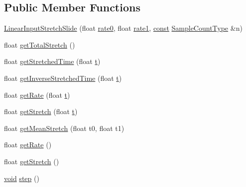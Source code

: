 \subsection*{Public Member Functions}
\begin{DoxyCompactItemize}
\item 
\hyperlink{class__sbsms___1_1_linear_input_stretch_slide_aae865a990bceaccef3c1158edd4400ac}{Linear\+Input\+Stretch\+Slide} (float \hyperlink{class__sbsms___1_1_linear_input_stretch_slide_ae0200a4c98938e77f57ef34a1d03c34f}{rate0}, float \hyperlink{class__sbsms___1_1_linear_input_stretch_slide_ac1cf5c07b027eaa2e5b93d0c45e9821c}{rate1}, \hyperlink{getopt1_8c_a2c212835823e3c54a8ab6d95c652660e}{const} \hyperlink{namespace__sbsms___ae4ba47977e7e07f5945e529e2256b662}{Sample\+Count\+Type} \&n)
\item 
float \hyperlink{class__sbsms___1_1_linear_input_stretch_slide_a250cdb5eec1f46eb843f8b78518d2253}{get\+Total\+Stretch} ()
\item 
float \hyperlink{class__sbsms___1_1_linear_input_stretch_slide_a4c1af2b7abb0101000e205cae3af7e71}{get\+Stretched\+Time} (float \hyperlink{octave__test_8m_aaccc9105df5383111407fd5b41255e23}{t})
\item 
float \hyperlink{class__sbsms___1_1_linear_input_stretch_slide_a031d44648e983b0f6ce5f4f07d03ee40}{get\+Inverse\+Stretched\+Time} (float \hyperlink{octave__test_8m_aaccc9105df5383111407fd5b41255e23}{t})
\item 
float \hyperlink{class__sbsms___1_1_linear_input_stretch_slide_a3df3374b2fc91afa202c2fa421749ad9}{get\+Rate} (float \hyperlink{octave__test_8m_aaccc9105df5383111407fd5b41255e23}{t})
\item 
float \hyperlink{class__sbsms___1_1_linear_input_stretch_slide_a56dd3bd5fbfb04f5d2eed9a644f11175}{get\+Stretch} (float \hyperlink{octave__test_8m_aaccc9105df5383111407fd5b41255e23}{t})
\item 
float \hyperlink{class__sbsms___1_1_linear_input_stretch_slide_a75f5ae653fed20fd1b2dd014a9603ede}{get\+Mean\+Stretch} (float t0, float t1)
\item 
float \hyperlink{class__sbsms___1_1_linear_input_stretch_slide_ad085f40ebb1ebef5f84edb8f9c04c9fa}{get\+Rate} ()
\item 
float \hyperlink{class__sbsms___1_1_linear_input_stretch_slide_a0acc3f7ac05df7d9a662efe7550f3cb8}{get\+Stretch} ()
\item 
\hyperlink{sound_8c_ae35f5844602719cf66324f4de2a658b3}{void} \hyperlink{class__sbsms___1_1_linear_input_stretch_slide_a08868c7eb8d87096c1e8f005a9811075}{step} ()
\end{DoxyCompactItemize}
